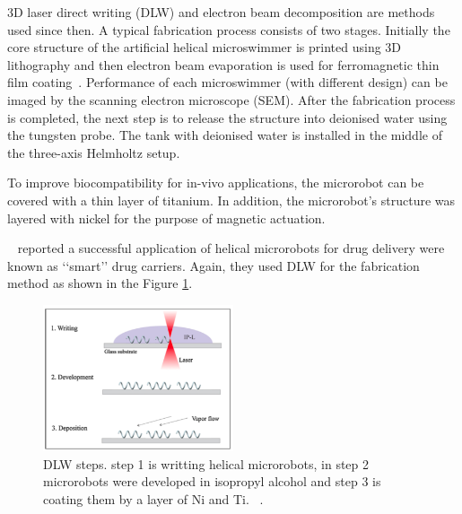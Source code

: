\documentclass[12pt,a4paper,titlepage]{report}
\begin{document}
3D laser direct writing (DLW) and electron beam decomposition are methods used since then. A typical 
fabrication process consists of two stages. Initially the core structure of the artificial helical 
microswimmer is printed using 3D lithography and then electron beam evaporation is used for 
ferromagnetic thin film coating~\citep{tottori2013artificial}.  
Performance of each microswimmer (with different design) can be imaged by the scanning electron
 microscope (SEM). After the fabrication process is completed, the next step is to release the structure into 
deionised water using the tungsten probe. The tank with deionised water is installed in the middle of the 
three-axis Helmholtz setup. 



To improve biocompatibility for in-vivo applications, the 
microrobot can be covered with a thin layer of titanium. In addition, the microrobot\rq{}s structure was layered with 
nickel for the purpose of magnetic actuation.

\citeauthor{qiu2014artificial}~\citep{qiu2014artificial} reported a successful application of helical microrobots
for drug delivery were known as \lq\lq{}smart\rq\rq{} drug carriers. Again, they used DLW for the fabrication method 
as shown in the Figure \ref{tempreture}. 




\begin{figure}
  \begin{center}
    \includegraphics[width=0.5\textwidth]{tempreture}
  \caption{DLW steps. step 1 is writting helical microrobots, in step 2 microrobots were 
developed in isopropyl alcohol and step 3 is coating them by a layer of Ni and Ti. ~\citep{qiu2014artificial}.}
  \label{tempreture}
\end{center}
\end{figure}
\end{document}
